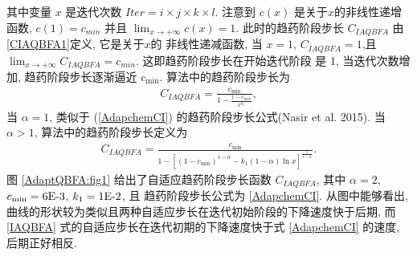 其中变量 $x$ 是迭代次数 $Iter=i\times j\times k \times l$. 注意到 $c(x)$ 是关于$x$的非线性递增函数, $c(1)=c_{min}$ 并且 $\lim_{x\rightarrow+\infty}c(x)=1$.
此时的趋药阶段步长 $C_{IAQBFA}$ 由\eqref{CIAQBFA1}定义, 它是关于$x$的 非线性递减函数, 当 $x=1$, $C_{IAQBFA}=1$,且 $\lim_{x\rightarrow+\infty}C_{IAQBFA}=c_{min}$.
这即趋药阶段步长在开始迭代阶段 是 1,  当迭代次数增加, 趋药阶段步长逐渐逼近 $c_{\min}$. 算法中的趋药阶段步长为
\begin{align}\label{IAQBFA0}
    C_{IAQBFA}=\frac{c_{\min}}{1-\frac{1-c_{min}}{x^{k_{1}}}},
\end{align}
当 $\alpha=1$, 类似于 (\ref{AdapchemCI}) 的趋药阶段步长公式(Nasir et al. 2015). 当 $\alpha> 1$, 算法中的趋药阶段步长定义为
\begin{align}\label{IAQBFA}
    C_{IAQBFA}=\frac{c_{\min}}{1- \left[(1-c_{\min})^{{1-\alpha}}-k_1(1-\alpha)\ln x \right]^{\frac 1 {1-\alpha}}}.
\end{align}
图 \ref{AdaptQBFA:fig1} 给出了自适应趋药阶段步长函数 $C_{IAQBFA}$, 其中 $\alpha=2$, $c_{\min}=6\textup{E-}3$, $k_1=1\textup{E-}2$, 且 趋药阶段步长公式为 \eqref{AdapchemCI}.
从图中能够看出, 曲线的形状较为类似且两种自适应步长在迭代初始阶段的下降速度快于后期, 而 \eqref{IAQBFA} 式的自适应步长在迭代初期的下降速度快于式 \eqref{AdapchemCI} 的速度, 后期正好相反.
